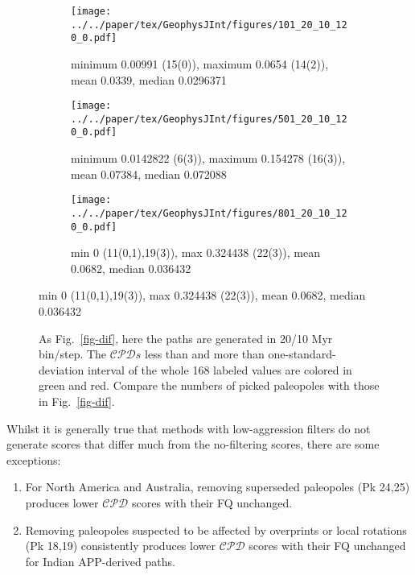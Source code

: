 \begin{figure}
  \centering
  \begin{subfigure}{.95\textwidth}
    \texttt{[image: ../../paper/tex/GeophysJInt/figures/101\_20\_10\_120\_0.pdf]}
    \caption{minimum 0.00991 (15(0)), maximum 0.0654 (14(2)),
      mean 0.0339, median 0.0296371}\label{fig-na-dif2010}
  \end{subfigure}
  \vspace{.1em}
  \begin{subfigure}{.95\textwidth}
    \texttt{[image: ../../paper/tex/GeophysJInt/figures/501\_20\_10\_120\_0.pdf]}
    \caption{minimum 0.0142822 (6(3)), maximum 0.154278 (16(3)), mean
      0.07384, median 0.072088}\label{fig-in-dif2010}
  \end{subfigure}
  \vspace{.1em}
  \begin{subfigure}{.95\textwidth}
    \texttt{[image: ../../paper/tex/GeophysJInt/figures/801\_20\_10\_120\_0.pdf]}
    \caption{min 0 (11(0,1),19(3)), max 0.324438 (22(3)),
      mean 0.0682, median 0.036432}\label{fig-au-dif2010}
  \end{subfigure}
\end{figure}
\begin{figure}[!ht]
  \ContinuedFloat\caption[$\mathcal{CPD}$ of each plate's paleomagnetic APWPs vs its FHM
    predicted APWP (20/10 Myr window/step)]{As Fig.~\ref{fig-dif}, here the
    paths are generated in 20/10 Myr bin/step. The $\mathcal{CPD}s$ less than
    and more than one-standard-deviation interval of the whole 168 labeled
    values are colored in green and red. Compare the numbers of picked
    paleopoles with those in Fig.~\ref{fig-dif}.}\label{fig-dif2010}
\end{figure}

Whilst it is generally true that methods with low-aggression filters do not
generate scores that differ much from the no-filtering scores, there are some
exceptions:
%
\begin{enumerate}
  \item For North America and Australia, removing superseded paleopoles (Pk
    24,25) produces lower $\mathcal{CPD}$ scores with their FQ unchanged.
  \item Removing paleopoles suspected to be affected by overprints or local
    rotations (Pk 18,19) consistently produces lower $\mathcal{CPD}$ scores with
    their FQ unchanged for Indian APP-derived paths.
\end{enumerate}

